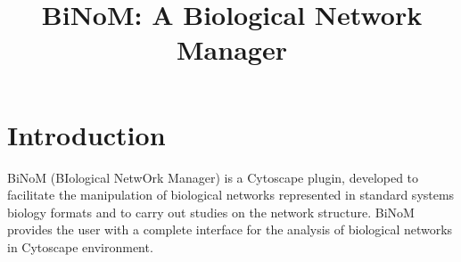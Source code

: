 \documentclass[11pt]{article}
\begin{document}
\begin{titlepage}
 
\vspace*{\fill}
\begin{figure}[h]
\end{figure}
\vspace*{\fill}

\newpage

\title{\huge{\textbf{BiNoM: A Biological Network Manager}}}
\date{}
\author{}
\maketitle

\vspace{4 cm}
\vspace{4 cm}


\end{titlepage}

\tableofcontents

\newpage

\section{Introduction}
BiNoM (BIological NetwOrk Manager) is a Cytoscape plugin, developed to
facilitate the manipulation of biological networks represented in standard
systems biology formats and to carry out studies on the network structure. BiNoM
provides the user with a complete interface for the analysis of biological
networks in Cytoscape environment.\\
\end{document}
